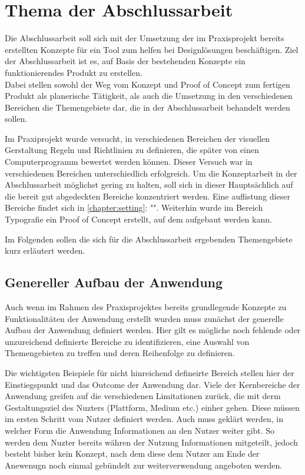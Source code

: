 \section{Thema der Abschlussarbeit}
Die Abschlussarbeit soll sich mit der Umsetzung der im Praxisprojekt bereits erstellten Konzepte für ein Tool zum helfen bei Designlösungen beschäftigen. Ziel der Abschlussarbeit ist es, auf Basis der bestehenden Konzepte ein funktionierendes Produkt zu erstellen.\\
Dabei stellen sowohl der Weg vom Konzept und Proof of Concept zum fertigen Produkt als planerische Tätigkeit, als auch die Umsetzung in den verschiedenen Bereichen die Themengebiete dar, die in der Abschlussarbeit behandelt werden sollen.

Im Praxiprojekt wurde versucht, in verschiedenen Bereichen der visuellen Gerstaltung Regeln und Richtlinien zu definieren, die später von einen Computerprogramm bewertet werden können. Dieser Versuch war in verschiedenen Bereichen unterschiedlich erfolgreich. Um die Konzeptarbeit in der Abschlussarbeit möglichst gering zu halten, soll sich in dieser Hauptsächlich auf die bereit gut abgedeckten Bereiche konzentriert werden. Eine auflistung dieser Bereiche findet sich in \autoref{chapter:setting}: "".
Weiterhin wurde im Bereich Typografie ein Proof of Concept erstellt, auf dem aufgebaut werden kann.

Im Folgenden sollen die sich für die Abschlussarbeit ergebenden Themengebiete kurz erläutert werden.

\subsection{Genereller Aufbau der Anwendung}
\label{chapter:setting}
Auch wenn im Rahmen des Praxisprojektes bereits grundlegende Konzepte zu Funktionalitäten der Anwendung erstellt wurden muss zunächst der generelle Aufbau der Anwendung definiert werden.
Hier gilt es mögliche noch fehlende oder unzureichend definierte Bereiche zu identifizieren, eine Auswahl von Themengebieten zu treffen und deren Reihenfolge zu definieren.

Die wichtigsten Beispiele für nicht hinreichend defineirte Bereich stellen hier der Einstiegspunkt und das Outcome der Anwendung dar.
Viele der Kernbereiche der Anwendung greifen auf die verschiedenen Limitationen zurück, die mit derm Gestaltungsziel des Nuzters (Plattform, Medium etc.) einher gehen. Diese müssen im ersten Schritt vom Nutzer definiert werden.
Auch muss geklärt werden, in welcher Form die Anwendung Informationen an den Nutzer weiter gibt. So werden dem Nuzter bereits währen der Nutzung Informationen mitgeteilt, jedoch besteht bisher kein Konzept, nach dem diese dem Nutzer am Ende der Anewenugn noch einmal gebündelt zur weiterverwendung angeboten werden.


